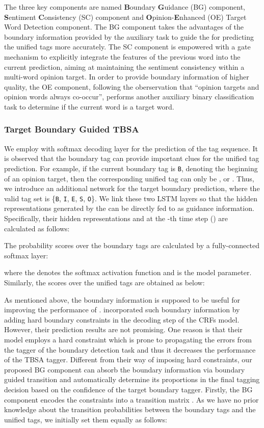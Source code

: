 \documentclass[letterpaper]{article} \usepackage{aaai19}  \usepackage{times}  \usepackage{helvet}  \usepackage{courier}  \usepackage{url}  \usepackage{graphicx}  \frenchspacing  \setlength{\pdfpagewidth}{8.5in}  \setlength{\pdfpageheight}{11in}
\begin{document}
The three key components are named \textbf{B}oundary \textbf{G}uidance (BG) component, \textbf{S}entiment \textbf{C}onsistency (SC) component and \textbf{O}pinion-\textbf{E}nhanced (OE) Target Word Detection component. The BG component takes the advantages of the boundary information provided by the auxiliary task to guide the  for predicting the unified tags more accurately. The SC component is empowered with a gate mechanism to explicitly integrate the features of the previous word into the current prediction, aiming at maintaining the sentiment consistency within a multi-word opinion target. In order to provide boundary information of higher quality, the OE component, following the oberservation that ``opinion targets and opinion words always co-occur'', performs another auxiliary binary classification task to determine if the current word is a target word.

\subsubsection{Target Boundary Guided TBSA}
We employ  with softmax decoding layer for the prediction of the tag sequence. It is observed that the boundary tag can provide important clues for the unified tag prediction. For example, if the current boundary tag is \texttt{B}, denoting the beginning of an opinion target, then the corresponding unified tag can only be ,  or . Thus, we introduce an additional network  for the target boundary prediction, where the valid tag set  is \{\texttt{B}, \texttt{I}, \texttt{E}, \texttt{S}, \texttt{O}\}. We link these two LSTM layers so that the hidden representations generated by the  can be directly fed to  as guidance information. 
Specifically, their hidden representations  and  at the -th time step () are calculated as follows:

The probability scores  over the boundary tags are calculated by a fully-connected softmax layer:

where the  denotes the softmax activation function and  is the model parameter. Similarly, the scores over the unified tags  are obtained as below:


As mentioned above, the boundary information is supposed to be useful for improving the performance of . \cite{D15-1073} incorporated such boundary information by adding hard boundary constraints in the decoding step of the CRFs model. However, their prediction results are not promising. One reason is that their model employs a hard constraint which is prone to propagating the errors from the tagger of the boundary detection task and thus it decreases the performance of the TBSA tagger. Different from their way of imposing hard constraints, our proposed BG component can absorb the boundary information via boundary guided transition and automatically determine its proportions in the final tagging decision based on the confidence of the target boundary tagger. Firstly, the BG component encodes the constraints into a transition matrix .
As we have no prior knowledge about the transition probabilities between the boundary tags and the unified tags, we initially set them equally as follows:
\end{document}
